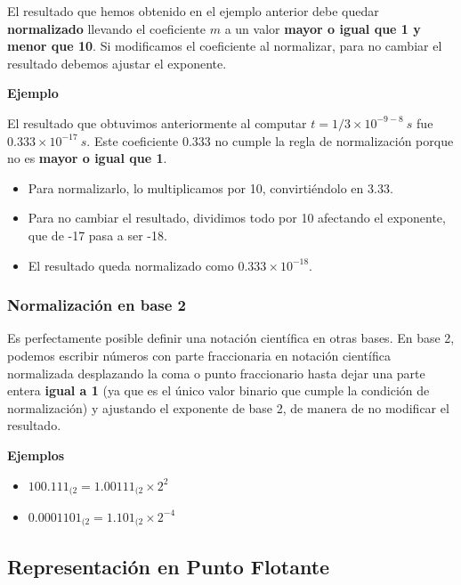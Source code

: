 \documentclass[spanish,A4,]{article}
\begin{document}
El resultado que hemos obtenido en el ejemplo anterior debe quedar
\textbf{normalizado} llevando el coeficiente $m$ a un valor
\textbf{mayor o igual que 1 y menor que 10}. Si modificamos el
coeficiente al normalizar, para no cambiar el resultado debemos ajustar
el exponente.

\textbf{Ejemplo}

El resultado que obtuvimos anteriormente al computar
$t = 1 / 3 \times 10^{-9-8}\ s $ fue $0.333 \times 10^{-17}\ s$. Este
coeficiente $0.333$ no cumple la regla de normalización porque no es
\textbf{mayor o igual que 1}.

\begin{itemize}
\itemsep1pt\parskip0pt
\item
  Para normalizarlo, lo multiplicamos por 10, convirtiéndolo en $3.33$.
\item
  Para no cambiar el resultado, dividimos todo por 10 afectando el
  exponente, que de -17 pasa a ser -18.
\item
  El resultado queda normalizado como $0.333\times 10^{-18}$.
\end{itemize}

\subsubsection{Normalización en base
2}\label{normalizaciuxf3n-en-base-2}

Es perfectamente posible definir una notación científica en otras bases.
En base 2, podemos escribir números con parte fraccionaria en notación
científica normalizada desplazando la coma o punto fraccionario hasta
dejar una parte entera \textbf{igual a 1} (ya que es el único valor
binario que cumple la condición de normalización) y ajustando el
exponente de base 2, de manera de no modificar el resultado.

\textbf{Ejemplos}

\begin{itemize}
\itemsep1pt\parskip0pt
\item
  $100.111_{(2} = 1.00111_{(2} \times 2^2$
\item
  $0.0001101_{(2} = 1.101_{(2} \times 2^{-4}$
\end{itemize}

\subsection{Representación en Punto
Flotante}\label{representaciuxf3n-en-punto-flotante}
\end{document}
